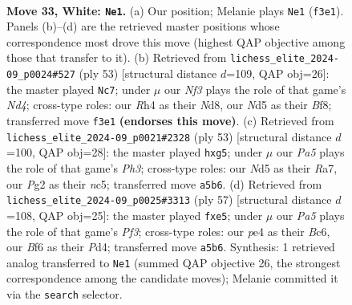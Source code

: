 \documentclass[11pt]{article}
\begin{document}
\clearpage

\begin{figure}[p]\centering
\begin{subfigure}{0.46\textwidth}\centering
\resizebox{\linewidth}{!}{%
\newchessgame
\chessboard[
  setfen={r1k1r3/2pb4/pp1n1B2/P2N1p2/4p2R/1B3N2/1P2KPP1/R7 w - - 1 33},
  showmover=false,
  pgfstyle=straightmove, color=movearrow, markmove={f3-e1}
]}
\caption{}
\end{subfigure}\hfill
\begin{subfigure}{0.46\textwidth}\centering
\resizebox{\linewidth}{!}{%
\newchessgame
\chessboard[
  setfen={2kn1b1r/p5p1/1p5p/1R1nP2P/2rP2P1/2P5/P2BN3/1R4K1 b - - 1 27},
  showmover=false,
  pgfstyle=straightmove, color=movearrow, markmove={d5-c7}
]}
\caption{}
\end{subfigure}
\\[4pt]
\begin{subfigure}{0.46\textwidth}\centering
\resizebox{\linewidth}{!}{%
\newchessgame
\chessboard[
  setfen={6k1/r5b1/1np2p1p/2Nn1bP1/1P1P4/5NP1/5BBP/4R1K1 b - - 0 27},
  showmover=false,
  pgfstyle=straightmove, color=movearrow, markmove={h6-g5}
]}
\caption{}
\end{subfigure}\hfill
\begin{subfigure}{0.46\textwidth}\centering
\resizebox{\linewidth}{!}{%
\newchessgame
\chessboard[
  setfen={r2b1kr1/pp6/2b2p2/4Pn2/3pNB2/5PP1/P3NK1P/1R3R2 b - - 1 29},
  showmover=false,
  pgfstyle=straightmove, color=movearrow, markmove={f6-e5}
]}
\caption{}
\end{subfigure}
\caption{\textbf{Move 33, White: \texttt{Ne1}.} (a) Our position; Melanie plays \texttt{Ne1} (\texttt{f3e1}). Panels (b)--(d) are the retrieved master positions whose correspondence most drove this move (highest QAP objective among those that transfer to it). (b) Retrieved from \texttt{lichess\_elite\_2024-09\_p0024\#527} (ply 53) [structural distance $d$=109, QAP obj=26]: the master played \texttt{Nc7}; under $\mu$ our \emph{Nf3} plays the role of that game's \emph{Nd4}; cross-type roles: our \emph{R}h4 as their \emph{N}d8, our \emph{N}d5 as their \emph{B}f8; transferred move \texttt{f3e1} \textbf{(endorses this move)}. (c) Retrieved from \texttt{lichess\_elite\_2024-09\_p0021\#2328} (ply 53) [structural distance $d$=100, QAP obj=28]: the master played \texttt{hxg5}; under $\mu$ our \emph{Pa5} plays the role of that game's \emph{Ph3}; cross-type roles: our \emph{N}d5 as their \emph{R}a7, our \emph{P}g2 as their \emph{n}c5; transferred move \texttt{a5b6}. (d) Retrieved from \texttt{lichess\_elite\_2024-09\_p0025\#3313} (ply 57) [structural distance $d$=108, QAP obj=25]: the master played \texttt{fxe5}; under $\mu$ our \emph{Pa5} plays the role of that game's \emph{Pf3}; cross-type roles: our \emph{p}e4 as their \emph{B}c6, our \emph{B}f6 as their \emph{P}d4; transferred move \texttt{a5b6}. Synthesis: 1 retrieved analog transferred to \texttt{Ne1} (summed QAP objective 26, the strongest correspondence among the candidate moves); Melanie committed it via the \texttt{search} selector.}
\label{fig:thought-m64}
\end{figure}
\end{document}
